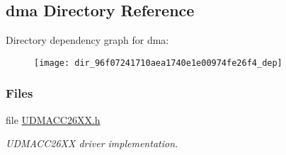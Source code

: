 \subsection{dma Directory Reference}
\label{dir_96f07241710aea1740e1e00974fe26f4}
Directory dependency graph for dma\+:
\nopagebreak
\begin{figure}[H]
\begin{center}
\leavevmode
\texttt{[image: dir\_96f07241710aea1740e1e00974fe26f4\_dep]}
\end{center}
\end{figure}
\subsubsection*{Files}
\begin{DoxyCompactItemize}
\item 
file \hyperlink{_u_d_m_a_c_c26_x_x_8h}{U\+D\+M\+A\+C\+C26\+X\+X.\+h}
\begin{DoxyCompactList}\small\item\em U\+D\+M\+A\+C\+C26\+X\+X driver implementation. \end{DoxyCompactList}\end{DoxyCompactItemize}
